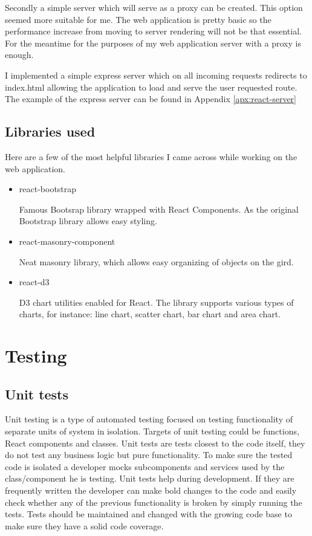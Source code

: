 \documentclass[thesis=M,english]{FITthesis}[2012/10/20]
\begin{document}
Secondly a simple server which will serve as a proxy can be created. This option seemed more suitable for me. The web application is pretty basic so the performance increase from moving to server rendering will not be that essential. For the meantime for the purposes of my web application server with a proxy is enough.

I implemented a simple express server which on all incoming requests redirects to index.html allowing the application to load and serve the user requested route. The example of the express server can be found in Appendix \ref{apx:react-server}

\subsection{Libraries used}

Here are a few of the most helpful libraries I came across while working on the web application.

\begin{itemize}
	
	\item react-bootstrap 
	
	Famous Bootsrap library wrapped with React Components. As the original Bootstrap library allows easy styling. \cite{react-boot}
	\item react-masonry-component
	
	Neat masonry library, which allows easy organizing of objects on the gird.  \cite{react-masonry}
	\item react-d3 
	
	D3 chart utilities enabled for React. The library supports various types of charts, for instance: line chart, scatter chart, bar chart and area chart. \cite{react-d3}
	
\end{itemize}
\section{Testing}


\subsection{Unit tests}
Unit testing is a type of automated testing focused on testing functionality of separate units of system in isolation. Targets of unit testing could be functions, React components and classes. Unit tests are tests closest to the code itself, they do not test any business logic but pure functionality. To make sure the tested code is isolated a developer mocks subcomponents and services used by the class/component he is testing. \cite{redux-tests} Unit tests help during development. If they are frequently written the developer can make bold changes to the code and easily check whether any of the previous functionality is broken by simply running the tests. Tests should be maintained and changed with the growing code base to make sure they have a solid code coverage.
\end{document}
